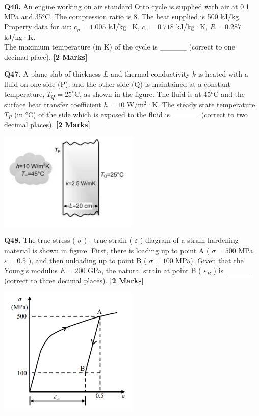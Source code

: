 \documentclass[11pt]{article}
\newcommand{\questionb}[2]{
    \noindent\textbf{Q#2.} #1 \hfill \textbf{[2 Marks]}
}
\begin{document}
\questionb{An engine working on air standard Otto cycle is supplied with air at 0.1 MPa and 35°C. The compression ratio is 8. The heat supplied is 500 kJ/kg. \\
Property data for air: \( c_p = 1.005 \) kJ/kg·K, \( c_v = 0.718 \) kJ/kg·K, \( R = 0.287 \) kJ/kg·K. \\
The maximum temperature (in K) of the cycle is \_\_\_\_\_ (correct to one decimal place).}{46}
\vspace{0.5cm}

\questionb{A plane slab of thickness \( L \) and thermal conductivity \( k \) is heated with a fluid on one side (P), and the other side (Q) is maintained at a constant temperature, \( T_Q = 25^\circ \)C, as shown in the figure. The fluid is at 45°C and the surface heat transfer coefficient \( h = 10 \) W/m\(^2\)·K. The steady state temperature \( T_P \) (in °C) of the side which is exposed to the fluid is \_\_\_\_\_ (correct to two decimal places).}{47}
\begin{center}
\includegraphics[width=0.5\textwidth]{figures/47.png}
\end{center}
\vspace{0.5cm}

\questionb{The true stress ( \( \sigma \) ) - true strain ( \( \varepsilon \) ) diagram of a strain hardening material is shown in figure. First, there is loading up to point A ( \( \sigma = 500 \) MPa, \( \varepsilon = 0.5 \) ), and then unloading up to point B ( \( \sigma = 100 \) MPa). Given that the Young’s modulus \( E = 200 \) GPa, the natural strain at point B ( \( \varepsilon_B \) ) is \_\_\_\_\_ (correct to three decimal places).}{48}
\begin{center}
\includegraphics[width=0.5\textwidth]{figures/48.png}
\end{center}
\vspace{0.5cm}
\end{document}
